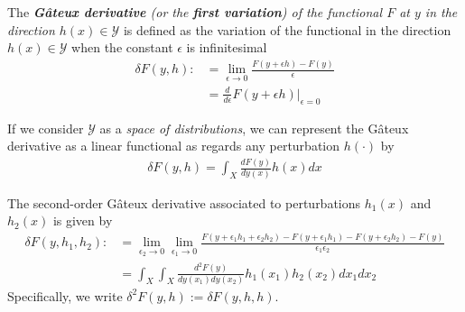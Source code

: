 \documentclass[11pt]{elegantbook}
\begin{document}
\begin{definition}
    The  \textit{\textbf{Gâteux derivative} (or the \textbf{first variation}) of the functional $F$ at $y$ in the direction $h(x)\in \mathcal{Y}$} is defined as the variation of the functional in the direction $h(x)\in \mathcal{Y}$ when the constant $\epsilon$ is infinitesimal
    \begin{equation}
        \begin{aligned}
            \delta F(y,h):&=\lim_{\epsilon \rightarrow 0}\frac{F(y+\epsilon h)-F(y)}{\epsilon}\\
            &=\frac{d}{d \epsilon} F(y+\epsilon h)\bigg|_{\epsilon=0}
        \end{aligned}
        \nonumber
    \end{equation}
\end{definition}

\begin{corollary}
    If we consider $\mathcal{Y}$ as a \textit{space of  distributions}, we can represent the Gâteux derivative as a linear functional as regards any perturbation $h(\cdot)$ by
    \begin{equation}
        \begin{aligned}
            \delta F(y,h)=\int_X\frac{d F(y)}{d y(x)}h(x) dx
        \end{aligned}
        \nonumber
    \end{equation}
\end{corollary}

\begin{definition}
    The second-order Gâteux derivative associated to perturbations $h_1(x)$ and $h_2(x)$ is given by
    \begin{equation}
        \begin{aligned}
            \delta F(y,h_1,h_2):&=\lim_{\epsilon_2 \rightarrow 0}\lim_{\epsilon_1 \rightarrow 0}\frac{F(y+\epsilon_1 h_1+\epsilon_2 h_2)-F(y+\epsilon_1 h_1)-F(y+\epsilon_2 h_2)-F(y)}{\epsilon_1 \epsilon_2}\\
            &=\int_X\int_X \frac{d^2 F(y)}{d y(x_1) dy(x_2)}h_1(x_1)h_2(x_2) dx_1 dx_2
        \end{aligned}
        \nonumber
    \end{equation}
    Specifically, we write $\delta^2 F(y,h):=\delta F(y,h,h)$.
\end{definition}
\end{document}
